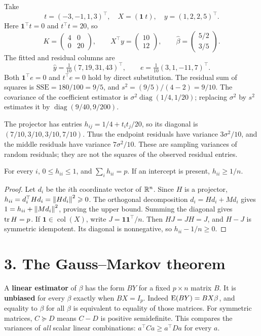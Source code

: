 \begin{example}\label{eg:11:fit}
Take
\[
t=(-3,-1,1,3)^\top,\quad X=(\mathbf1\ t),\quad y=(1,2,2,5)^\top.
\]
Here $\mathbf1^\top t=0$ and $t^\top t=20$, so
\[
K=\begin{pmatrix}4&0\\0&20\end{pmatrix},\qquad
X^\top y=\begin{pmatrix}10\\12\end{pmatrix},\qquad
\widehat\beta=\begin{pmatrix}5/2\\3/5\end{pmatrix}.
\]
The fitted and residual columns are
\[
\widehat y=\tfrac1{10}(7,19,31,43)^\top,\qquad
e=\tfrac1{10}(3,1,-11,7)^\top.
\]
Both $\mathbf1^\top e=0$ and $t^\top e=0$ hold by direct substitution.
The residual sum of squares is $\mathrm{SSE}=180/100=9/5$, and
$s^2=(9/5)/(4-2)=9/10$.
The covariance of the coefficient estimator is
$\sigma^2\operatorname{diag}(1/4,1/20)$; replacing $\sigma^2$ by $s^2$
estimates it by $\operatorname{diag}(9/40,9/200)$.

The projector has entries
$h_{ij}=1/4+t_it_j/20$, so its diagonal is
$(7/10,3/10,3/10,7/10)$. Thus the endpoint residuals have variance
$3\sigma^2/10$, and the middle residuals have variance $7\sigma^2/10$.
These are sampling variances of random residuals; they are not the squares
of the observed residual entries.
\end{example}

\begin{proposition}[Leverage]
For every $i$, $0\leqslant h_{ii}\leqslant1$, and $\sum_i h_{ii}=p$.
If an intercept is present, $h_{ii}\geqslant1/n$.
\end{proposition}
\begin{proof}
Let $d_i$ be the $i$th coordinate vector of $\mathbb R^n$. Since $H$ is a
projector, $h_{ii}=d_i^\top Hd_i=\left\lVert Hd_i\right\rVert^2\geqslant0$.
The orthogonal decomposition $d_i=Hd_i+Md_i$ gives
$1=h_{ii}+\left\lVert Md_i\right\rVert^2$, proving the upper bound.
Summing the diagonal gives $\operatorname{tr} H=p$.
If $\mathbf1\in\operatorname{col}(X)$, write
$J=\mathbf1\mathbf1^\top/n$. Then $HJ=JH=J$, and $H-J$ is symmetric
idempotent. Its diagonal is nonnegative, so $h_{ii}-1/n\geqslant0$.
\end{proof}

\section*{3. The Gauss--Markov theorem}
A \textbf{linear estimator} of $\beta$ has the form $BY$ for a fixed
$p\times n$ matrix $B$. It is \textbf{unbiased} for every $\beta$ exactly
when $BX=I_p$. Indeed $\operatorname{E}(BY)=BX\beta$, and equality to $\beta$ for all
$\beta$ is equivalent to equality of those matrices.
For symmetric matrices, $C\succeq D$ means $C-D$ is positive semidefinite.
This compares the variances of \emph{all} scalar linear combinations:
$a^\top Ca\geqslant a^\top Da$ for every $a$.


